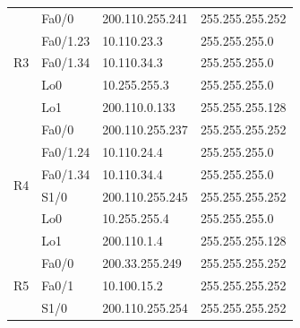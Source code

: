 \documentclass[12pt,twoside,a4paper]{report}
\begin{document}
\begin{table}[!htbp]
\begin{tabular}{|c|l|l|l|}
\multirow{5}{*}{R3}  & Fa0/0                                   & 200.110.255.241                         & 255.255.255.252                     \\ \cline{2-4} 
                     & Fa0/1.23                                & 10.110.23.3                             & 255.255.255.0                       \\ \cline{2-4} 
                     & Fa0/1.34                                & 10.110.34.3                             & 255.255.255.0                       \\ \cline{2-4} 
                     & Lo0                                     & 10.255.255.3                            & 255.255.255.0                       \\ \cline{2-4} 
                     & Lo1                                     & 200.110.0.133                           & 255.255.255.128                     \\ \hline
\multirow{6}{*}{R4}  & Fa0/0                                   & 200.110.255.237                         & 255.255.255.252                     \\ \cline{2-4} 
                     & Fa0/1.24                                & 10.110.24.4                             & 255.255.255.0                       \\ \cline{2-4} 
                     & Fa0/1.34                                & 10.110.34.4                             & 255.255.255.0                       \\ \cline{2-4} 
                     & S1/0                                    & 200.110.255.245                         & 255.255.255.252                     \\ \cline{2-4} 
                     & Lo0                                     & 10.255.255.4                            & 255.255.255.0                       \\ \cline{2-4} 
                     & Lo1                                     & 200.110.1.4                             & 255.255.255.128                     \\ \hline
\multirow{5}{*}{R5}  & Fa0/0                                   & 200.33.255.249                          & 255.255.255.252                     \\ \cline{2-4} 
                     & Fa0/1                                   & 10.100.15.2                             & 255.255.255.252                     \\ \cline{2-4} 
                     & S1/0                                    & 200.110.255.254                         & 255.255.255.252                     \\ \cline{2-4} 

\end{tabular}
\end{table}
\end{document}
